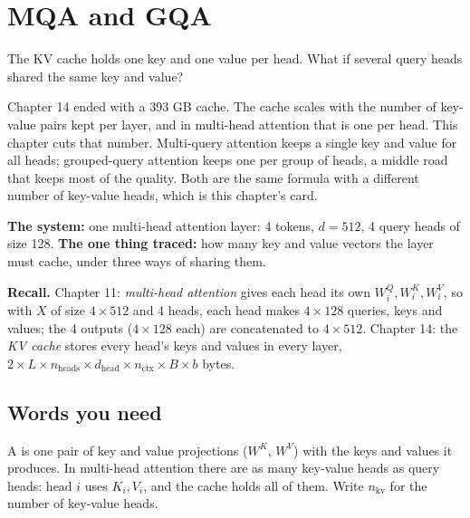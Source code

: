 \chapter{MQA and GQA}
\label{ch:gqa}

\begin{question}
The KV cache holds one key and one value per head. What if several query heads shared the same key and value?
\end{question}

\begin{whatfor}
Chapter 14 ended with a 393 GB cache. The cache scales with the number of key-value pairs kept per layer, and in multi-head attention that is one per head. This chapter cuts that number. Multi-query attention keeps a single key and value for all heads; grouped-query attention keeps one per group of heads, a middle road that keeps most of the quality. Both are the same formula with a different number of key-value heads, which is this chapter's card.
\end{whatfor}

\begin{setup}
\textbf{The system:} one multi-head attention layer: 4 tokens, $d = 512$, 4 query heads of size 128.
\textbf{The one thing traced:} how many key and value vectors the layer must cache, under three ways of sharing them.
\end{setup}

\begin{recall}
\textbf{Recall.} Chapter 11: \emph{multi-head attention} gives each head its own $W^Q_i, W^K_i, W^V_i$, so with $X$ of size $4 \times 512$ and 4 heads, each head makes $4 \times 128$ queries, keys and values; the 4 outputs ($4 \times 128$ each) are concatenated to $4 \times 512$. Chapter 14: the \emph{KV cache} stores every head's keys and values in every layer, $2 \times L \times n_{\text{heads}} \times d_{\text{head}} \times n_{\text{ctx}} \times B \times b$ bytes.
\end{recall}

\section{Words you need}

\begin{definition}
A  is one pair of key and value projections ($W^K$, $W^V$) with the keys and values it produces. In multi-head attention there are as many key-value heads as query heads: head $i$ uses $K_i, V_i$, and the cache holds all of them. Write $n_{\text{kv}}$ for the number of key-value heads.
\end{definition}


